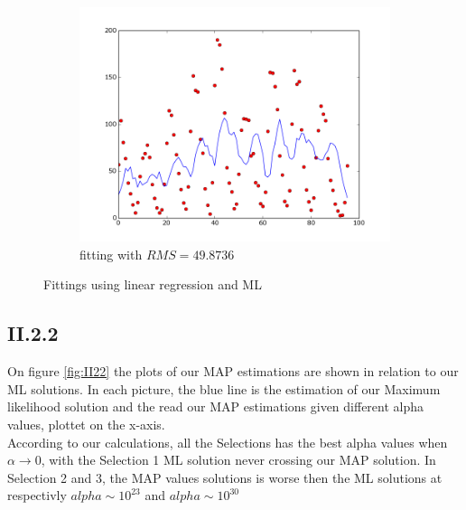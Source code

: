 \documentclass{article}
\begin{document}
\begin{figure}[!ht]
\begin{subfigure}[b]{0.5\textwidth}
        \includegraphics[width=\textwidth]{Part2/II213.png}
        \caption{fitting with $RMS = 49.8736$}
    \end{subfigure}
    \caption{Fittings using linear regression and ML}
    \label{fig:II21}
\end{figure}


\subsection{II.2.2}

On figure \ref{fig:II22} the plots of our MAP estimations are shown in relation
to our ML solutions. In each picture, the blue line is the estimation of
our Maximum likelihood solution and the read our MAP estimations given 
different alpha values, plottet on the x-axis.\\
According to our calculations, all the Selections has the best alpha values
when $\alpha \rightarrow 0$, with the Selection 1 ML solution never crossing 
our MAP solution. In Selection 2 and 3, the MAP values solutions is worse then the
ML solutions at respectivly $alpha \sim 10^{23}$ and $alpha \sim 10^{30}$

\end{document}
